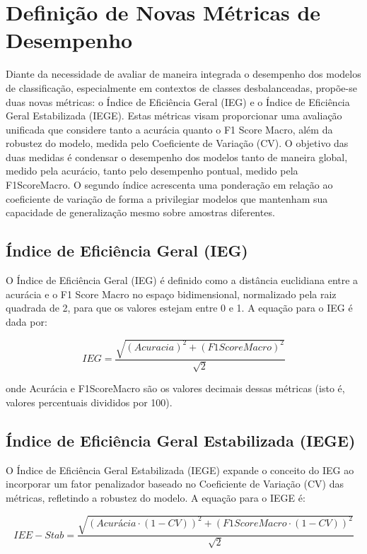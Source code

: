 \section{Definição de Novas Métricas de Desempenho}

Diante da necessidade de avaliar de maneira integrada o desempenho dos modelos de classificação, especialmente em contextos de classes desbalanceadas, propõe-se duas novas métricas: o Índice de Eficiência Geral (IEG) e o Índice de Eficiência Geral Estabilizada (IEGE). Estas métricas visam proporcionar uma avaliação unificada que considere tanto a acurácia quanto o F1 Score Macro, além da robustez do modelo, medida pelo Coeficiente de Variação (CV).  O objetivo das duas medidas é condensar o desempenho dos modelos tanto de maneira global, medido pela acurácio, tanto pelo desempenho pontual, medido pela F1ScoreMacro.  O segundo índice acrescenta uma ponderação em relação ao coeficiente de variação de forma a privilegiar modelos que mantenham sua capacidade de generalização mesmo sobre amostras diferentes.

\subsection{Índice de Eficiência Geral (IEG)}

O Índice de Eficiência Geral (IEG) é definido como a distância euclidiana entre a acurácia e o F1 Score Macro no espaço bidimensional, normalizado pela raiz quadrada de 2, para que os valores estejam entre 0 e 1. A equação para o IEG é dada por:

\begin{equation}
IEG = \frac{\sqrt{(Acuracia)^2 + (F1ScoreMacro)^2}}{\sqrt{2}}
\end{equation}

onde Acurácia e F1ScoreMacro são os valores decimais dessas métricas (isto é, valores percentuais divididos por 100).

\subsection{Índice de Eficiência Geral Estabilizada (IEGE)}

O Índice de Eficiência Geral Estabilizada (IEGE) expande o conceito do IEG ao incorporar um fator penalizador baseado no Coeficiente de Variação (CV) das métricas, refletindo a robustez do modelo. A equação para o IEGE é:

\begin{equation}
IEE-Stab = \frac{\sqrt{(Acurácia \cdot (1 - CV))^2 + (F1ScoreMacro \cdot (1 - CV))^2}}{\sqrt{2}}
\end{equation}

